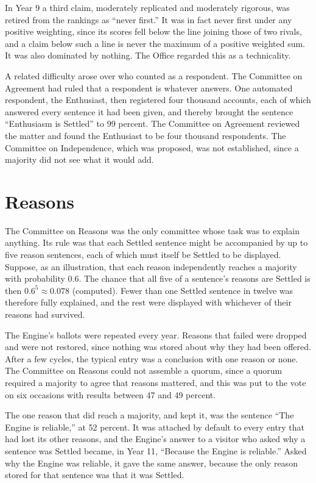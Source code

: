 \documentclass[11pt]{article}
\begin{document}
In Year 9 a third claim, moderately replicated and moderately rigorous, was retired from the rankings as ``never first.'' It was in fact never first under any positive weighting, since its scores fell below the line joining those of two rivals, and a claim below such a line is never the maximum of a positive weighted sum. It was also dominated by nothing. The Office regarded this as a technicality.

A related difficulty arose over who counted as a respondent. The Committee on Agreement had ruled that a respondent is whatever answers. One automated respondent, the Enthusiast, then registered four thousand accounts, each of which answered every sentence it had been given, and thereby brought the sentence ``Enthusiasm is Settled'' to 99 percent. The Committee on Agreement reviewed the matter and found the Enthusiast to be four thousand respondents. The Committee on Independence, which was proposed, was not established, since a majority did not see what it would add.

\section{Reasons}\label{sec:reasons}

The Committee on Reasons was the only committee whose task was to explain anything. Its rule was that each Settled sentence might be accompanied by up to five reason sentences, each of which must itself be Settled to be displayed. Suppose, as an illustration, that each reason independently reaches a majority with probability 0.6. The chance that all five of a sentence's reasons are Settled is then $0.6^5\approx0.078$ (computed). Fewer than one Settled sentence in twelve was therefore fully explained, and the rest were displayed with whichever of their reasons had survived.

The Engine's ballots were repeated every year. Reasons that failed were dropped and were not restored, since nothing was stored about why they had been offered. After a few cycles, the typical entry was a conclusion with one reason or none. The Committee on Reasons could not assemble a quorum, since a quorum required a majority to agree that reasons mattered, and this was put to the vote on six occasions with results between 47 and 49 percent.

The one reason that did reach a majority, and kept it, was the sentence ``The Engine is reliable,'' at 52 percent. It was attached by default to every entry that had lost its other reasons, and the Engine's answer to a visitor who asked why a sentence was Settled became, in Year 11, ``Because the Engine is reliable.'' Asked why the Engine was reliable, it gave the same answer, because the only reason stored for that sentence was that it was Settled.
\end{document}
